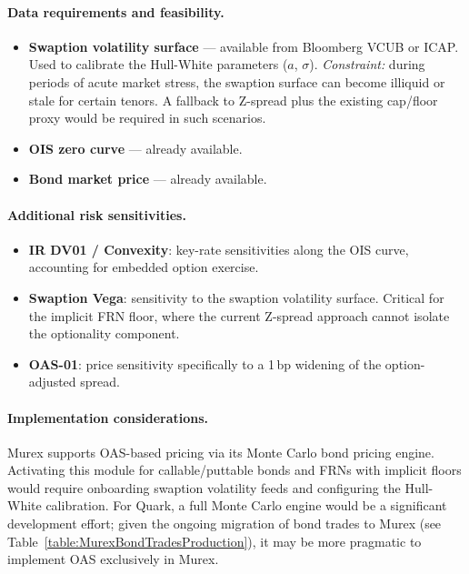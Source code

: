 \documentclass[reviewdoc]{pmv_report}  %
\begin{document}
\paragraph{Data requirements and feasibility.}
\begin{itemize}
  \item \textbf{Swaption volatility surface} --- available from Bloomberg VCUB or ICAP.
    Used to calibrate the Hull-White parameters ($a$, $\sigma$).
    \emph{Constraint:} during periods of acute market stress, the swaption surface can become illiquid or stale for certain tenors.
    A fallback to Z-spread plus the existing cap/floor proxy would be required in such scenarios.
  \item \textbf{OIS zero curve} --- already available.
  \item \textbf{Bond market price} --- already available.
\end{itemize}

\paragraph{Additional risk sensitivities.}
\begin{itemize}
  \item \textbf{IR DV01 / Convexity}: key-rate sensitivities along the OIS curve, accounting for embedded option exercise.
  \item \textbf{Swaption Vega}: sensitivity to the swaption volatility surface.
    Critical for the implicit FRN floor, where the current Z-spread approach cannot isolate the optionality component.
  \item \textbf{OAS-01}: price sensitivity specifically to a 1\,bp widening of the option-adjusted spread.
\end{itemize}

\paragraph{Implementation considerations.}
Murex supports OAS-based pricing via its Monte Carlo bond pricing engine.
Activating this module for callable/puttable bonds and FRNs with implicit floors would require onboarding swaption volatility feeds and configuring the Hull-White calibration.
For Quark, a full Monte Carlo engine would be a significant development effort; given the ongoing migration of bond trades to Murex (see Table~\ref{table:MurexBondTradesProduction}), it may be more pragmatic to implement OAS exclusively in Murex.
\end{document}
